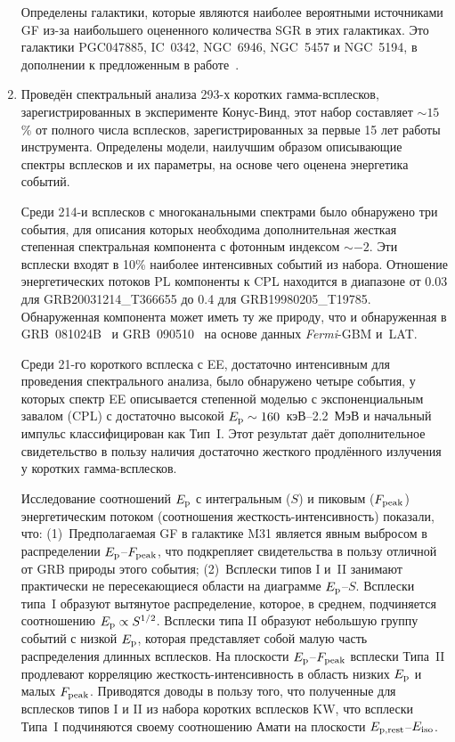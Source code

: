 \begin{enumerate}
    Определены галактики, которые являются наиболее вероятными источниками GF 
    из-за наибольшего оцененного количества SGR в этих галактиках. Это галактики
    PGC047885, IC~0342, NGC~6946, NGC~5457 и NGC~5194, в дополнении к предложенным 
    в работе~\citep{Popov2006}.
  
\item Проведён спектральный анализа 293-х коротких гамма-всплесков,
    зарегистрированных в эксперименте Конус-Винд, этот набор составляет $\sim 15$\% 
    от полного числа всплесков, зарегистрированных за первые 15 лет работы инструмента.
    Определены модели, наилучшим образом описывающие спектры всплесков и их параметры,
    на основе чего оценена энергетика событий. 
    
    Среди 214-и всплесков с многоканальными спектрами было обнаружено три
    события, для описания которых необходима дополнительная жесткая степенная 
    спектральная компонента с фотонным индексом $\sim -2$. Эти всплески входят в 10\%
    наиболее интенсивных событий из набора. Отношение энергетических потоков PL
    компоненты к CPL находится в диапазоне от 0.03 для GRB20031214\_T366655 до
    0.4 для GRB19980205\_T19785. Обнаруженная компонента может иметь ту же природу,
    что и обнаруженная в GRB~081024B~\citep{Abdo_2010ApJ_712_558A} и 
    GRB~090510~\citep{Ackermann_2010ApJ_716_1178A} на основе данных \textit{Fermi}-GBM и~LAT.
    
    Среди 21-го короткого всплеска с EE, достаточно интенсивным 
    для проведения спектрального анализа, было обнаружено четыре события, у которых 
    спектр EE описывается степенной моделью с экспоненциальным завалом (CPL) 
    с достаточно высокой $E_{\mathrm{p}} \sim 160$~кэВ--2.2~МэВ и начальный импульс 
    классифицирован как Тип~I. Этот результат даёт дополнительное свидетельство 
    в пользу наличия достаточно жесткого продлённого излучения у коротких гамма-всплесков. 
    
    Исследование соотношений $E_{\mathrm{p}}$ с интегральным ($S$) и пиковым ($F_{\mathrm{peak}}$) 
    энергетическим потоком (соотношения жесткость-интенсивность) показали, что:
    (1)~Предполагаемая GF в галактике M31 является явным выбросом в распределении $E_{\mathrm{p}}$--$F_{\mathrm{peak}}$, 
    что подкрепляет свидетельства в пользу отличной от GRB природы этого события;
    (2)~Всплески типов I и~II занимают практически не пересекающиеся области на диаграмме $E_{\mathrm{p}}$--$S$.
    Всплески типа~I образуют вытянутое распределение, которое, в среднем, подчиняется 
    соотношению $E_{\mathrm{p}} \propto S^{1/2}$. Всплески типа II образуют небольшую группу событий
    с низкой $E_{\mathrm{p}}$, которая представляет собой малую часть распределения длинных всплесков.
    На плоскости $E_{\mathrm{p}}$--$F_{\mathrm{peak}}$ всплески Типа~II продлевают корреляцию 
    жесткость-интенсивность в область низких $E_{\mathrm{p}}$ и малых $F_{\mathrm{peak}}$.
    Приводятся доводы в пользу того, что полученные для всплесков типов I и II из набора коротких 
    всплесков KW,  что всплески Типа~I подчиняются 
    своему соотношению Амати на плоскости $E_{\mathrm{p,rest}}$--$E_{\mathrm{iso}}$.
\end{enumerate}


\clearpage